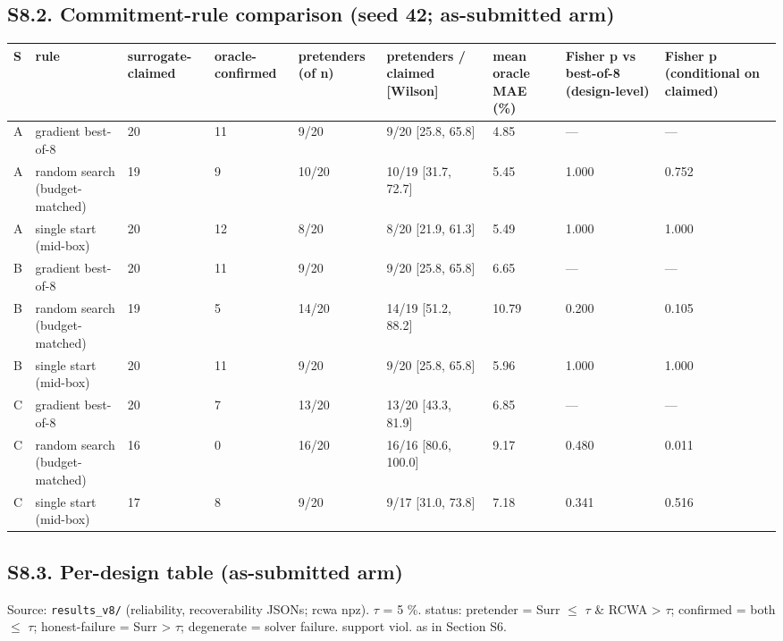 \documentclass[11pt,a4paper]{article}
\newcounter{none}   %
\begin{document}
\subsection*{S8.2. Commitment-rule comparison (seed 42; as-submitted arm)}

\begin{landscape}
\begingroup
\setlength{\tabcolsep}{2pt}\tiny
{}
\label{tab:9}
{\def\LTcaptype{none} %
\begin{longtable}[]{@{}lllllllll@{}}
\toprule\noalign{}
S & rule & surrogate-claimed & oracle-confirmed & pretenders (of n) & pretenders / claimed {[}Wilson{]} & mean oracle MAE (\%) & Fisher p vs best-of-8 (design-level) & Fisher p (conditional on claimed) \\
\midrule\noalign{}
\endhead
\bottomrule\noalign{}
\endlastfoot
A & gradient best-of-8 & 20 & 11 & 9/20 & 9/20 {[}25.8, 65.8{]} & 4.85 & --- & --- \\
A & random search (budget-matched) & 19 & 9 & 10/20 & 10/19 {[}31.7, 72.7{]} & 5.45 & 1.000 & 0.752 \\
A & single start (mid-box) & 20 & 12 & 8/20 & 8/20 {[}21.9, 61.3{]} & 5.49 & 1.000 & 1.000 \\
B & gradient best-of-8 & 20 & 11 & 9/20 & 9/20 {[}25.8, 65.8{]} & 6.65 & --- & --- \\
B & random search (budget-matched) & 19 & 5 & 14/20 & 14/19 {[}51.2, 88.2{]} & 10.79 & 0.200 & 0.105 \\
B & single start (mid-box) & 20 & 11 & 9/20 & 9/20 {[}25.8, 65.8{]} & 5.96 & 1.000 & 1.000 \\
C & gradient best-of-8 & 20 & 7 & 13/20 & 13/20 {[}43.3, 81.9{]} & 6.85 & --- & --- \\
C & random search (budget-matched) & 16 & 0 & 16/20 & 16/16 {[}80.6, 100.0{]} & 9.17 & 0.480 & 0.011 \\
C & single start (mid-box) & 17 & 8 & 9/20 & 9/17 {[}31.0, 73.8{]} & 7.18 & 0.341 & 0.516 \\
\end{longtable}
}
\endgroup
\end{landscape}

\subsection*{S8.3. Per-design table (as-submitted arm)}

Source: \texttt{results\_v8/} (reliability, recoverability JSONs; rcwa npz). \ensuremath{\tau} = 5 \%. status: pretender = Surr \ensuremath{\leq} \ensuremath{\tau} \& RCWA \textgreater{} \ensuremath{\tau}; confirmed = both \ensuremath{\leq} \ensuremath{\tau}; honest-failure = Surr \textgreater{} \ensuremath{\tau}; degenerate = solver failure. support viol. as in Section S6.
\end{document}

